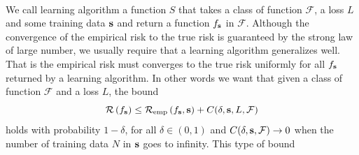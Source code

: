 \paragraph{}
We call learning algorithm a function $S$ that takes a class of function
$\mathcal{F}$, a loss $L$ and some training data $\boldsymbol{\mathbf{s}}$ and return a
function $f_{\boldsymbol{\mathbf{s}}}$ in $\mathcal{F}$. Although the convergence of
the empirical risk to the true risk is guaranteed by the strong law of large
number, we usually require that a learning algorithm generalizes well. That is
the empirical risk must converges to the true risk uniformly for all
$f_{\boldsymbol{\mathbf{s}}}$ returned by a learning algorithm. In other words we want 
that given a class of function $\mathcal{F}$ and a loss $L$, the bound
\begin{dmath*}
    \risk{f_{\seq{s}}} \le \riskemp{f_{\seq{s}}, \seq{s}} + C(\delta, \seq{s},
    L, \mathcal{F})
\end{dmath*}
holds with probability $1-\delta$, for all $\delta\in(0, 1)$ and $C(\delta,
\boldsymbol{\mathbf{s}}, \mathcal{F}) \to 0$ when the number of training data $N$ in $\boldsymbol{\mathbf{s}}$
goes to infinity. This type of bound
